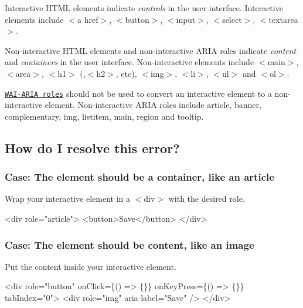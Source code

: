 Interactive H\+T\+ML elements indicate {\itshape controls} in the user interface. Interactive elements include {\ttfamily $<$a href$>$}, {\ttfamily $<$button$>$}, {\ttfamily $<$input$>$}, {\ttfamily $<$select$>$}, {\ttfamily $<$textarea$>$}.

Non-\/interactive H\+T\+ML elements and non-\/interactive A\+R\+IA roles indicate {\itshape content} and {\itshape containers} in the user interface. Non-\/interactive elements include {\ttfamily $<$main$>$}, {\ttfamily $<$area$>$}, {\ttfamily $<$h1$>$} (,{\ttfamily $<$h2$>$}, etc), {\ttfamily $<$img$>$}, {\ttfamily $<$li$>$}, {\ttfamily $<$ul$>$} and {\ttfamily $<$ol$>$}.

\href{https://www.w3.org/TR/wai-aria-1.1/#usage_intro}{\tt W\+A\+I-\/\+A\+R\+IA roles} should not be used to convert an interactive element to a non-\/interactive element. Non-\/interactive A\+R\+IA roles include {\ttfamily article}, {\ttfamily banner}, {\ttfamily complementary}, {\ttfamily img}, {\ttfamily listitem}, {\ttfamily main}, {\ttfamily region} and {\ttfamily tooltip}.

\subsection*{How do I resolve this error?}

\subsubsection*{Case\+: The element should be a container, like an article}

Wrap your interactive element in a {\ttfamily $<$div$>$} with the desired role.


\begin{DoxyCode}
<div role="article">
  <button>Save</button>
</div>
\end{DoxyCode}


\subsubsection*{Case\+: The element should be content, like an image}

Put the content inside your interactive element.


\begin{DoxyCode}
<div
  role="button"
  onClick=\{() => \{\}\}
  onKeyPress=\{() => \{\}\}
  tabIndex="0">
  <div role="img" aria-label="Save" />
</div>
\end{DoxyCode}


